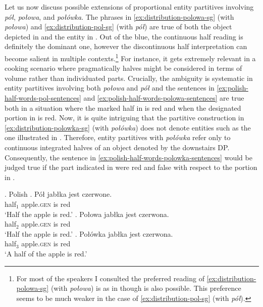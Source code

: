 Let us now discuss possible extensions of proportional entity partitives involving \textit{pół}, \textit{połowa}, and \textit{połówka}. The phrases in \ref{ex:distribution-polowa-sg} (with \textit{połowa}) and \ref{ex:distribution-pol-sg} (with \textit{pół}) are true of both the object depicted in  and the entity in  . Out of the blue, the continuous half reading is definitely the dominant one, however the discontinuous half interpretation can become salient in multiple contexts.\footnote{For most of the speakers I consulted the preferred reading of \ref{ex:distribution-polowa-sg} (with \textit{połowa}) is as in  though  is also possible. This preference seems to be much weaker in the case of \ref{ex:distribution-pol-sg} (with \textit{pół}).} For instance, it gets extremely relevant in a cooking scenario where pragmatically halves might be considered in terms of volume rather than individuated parts. Crucially, the ambiguity is systematic in entity partitives involving both \textit{połowa} and \textit{pół} and the sentences in \ref{ex:polish-half-words-pol-sentences} and \ref{ex:polish-half-words-polowa-sentences} are true both in a situation where the marked half in   is red and when the designated portion in  is red. Now, it is quite intriguing that the partitive construction in \ref{ex:distribution-polowka-sg} (with \textit{połówka}) does not denote entities such as the one illustrated in . Therefore, entity partitives with \textit{połówka} refer only to continuous integrated halves of an object denoted by the downstairs DP. Consequently, the sentence in \ref{ex:polish-half-words-polowka-sentences} would be judged true if the part indicated in  were red and false with respect to the portion in .

\ex.\label{ex:polish-half-words-sentences} Polish
\ag. Pół jabłka jest czerwone.\label{ex:polish-half-words-pol-sentences}\\
half$_1$ apple\textsc{.gen} is red\\
`Half the apple is red.'
\bg. Połowa jabłka jest czerwona.\label{ex:polish-half-words-polowa-sentences}\\
half$_2$ apple\textsc{.gen} is red\\
`Half the apple is red.'
\bg. Połówka jabłka jest czerwona.\label{ex:polish-half-words-polowka-sentences}\\
half$_3$ apple\textsc{.gen} is red\\
`A half of the apple is red.'

